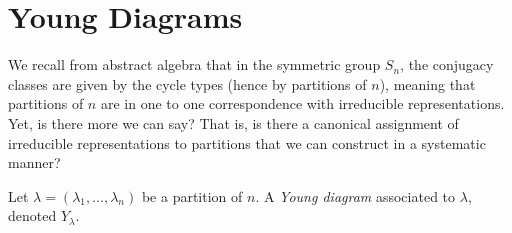 \documentclass[10pt]{mypackage}
\begin{document}
\RaggedRight
\section{Young Diagrams}%
We recall from abstract algebra that in the symmetric group $S_n$, the conjugacy classes are given by the cycle types (hence by partitions of $n$), meaning that partitions of $n$ are in one to one correspondence with irreducible representations. Yet, is there more we can say? That is, is there a canonical assignment of irreducible representations to partitions that we can construct in a systematic manner?
\begin{definition}
  Let $\lambda = \left( \lambda_1,\dots,\lambda_n \right)$ be a partition of $n$. A \textit{Young diagram} associated to $\lambda$, denoted $Y_{\lambda}$.
\end{definition}
\nocite{rep_theory_etingof}
\printbibliography
\end{document}
